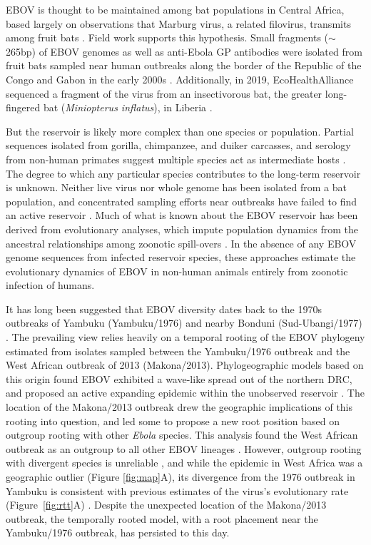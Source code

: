 \documentclass[11pt,a4paper]{article}
\begin{document}
EBOV is thought to be maintained among bat populations in Central Africa, based largely on observations that Marburg virus, a related filovirus, transmits among fruit bats \cite{Towner2009-kz,Paweska2020-fz}.
Field work supports this hypothesis.
Small fragments ($\sim$265bp) of EBOV genomes as well as anti-Ebola GP antibodies were isolated from fruit bats sampled near human outbreaks along the border of the Republic of the Congo and Gabon in the early 2000s \cite{Leroy2005-vr}.
Additionally, in 2019, EcoHealthAlliance sequenced a fragment of the virus from an insectivorous bat, the greater long-fingered bat (\textit{Miniopterus inflatus}), in Liberia \cite{Kupferschmidt2021-mf,Kessler2019-gk,Kessler2019-lq}.


But the reservoir is likely more complex than one species or population.
Partial sequences isolated from gorilla, chimpanzee, and duiker carcasses, and serology from non-human primates suggest multiple species act as intermediate hosts \cite{Leroy2004-jr,Leroy2004-fk,Wittmann2007-hm}. 
The degree to which any particular species contributes to the long-term reservoir is unknown.
Neither live virus nor whole genome has been isolated from a bat population, and concentrated sampling efforts near outbreaks have failed to find an active reservoir \cite{Lacroix2021-zs}.
Much of what is known about the EBOV reservoir has been derived from evolutionary analyses, which impute population dynamics from the ancestral relationships among zoonotic spill-overs \cite{Wittmann2007-hm,Biek2006-br,Walsh2005-zc}. 
In the absence of any EBOV genome sequences from infected reservoir species, these approaches estimate the evolutionary dynamics of EBOV in non-human animals entirely from zoonotic infection of humans. 


It has long been suggested that EBOV diversity dates back to the 1970s outbreaks of Yambuku (Yambuku/1976) and nearby Bonduni (Sud-Ubangi/1977) \cite{Heymann1980-dq,Carroll2013-jz,Biek2006-br,Walsh2005-zc,Grard2011-ue}.
The prevailing view relies heavily on a temporal rooting of the EBOV phylogeny estimated from isolates sampled between the Yambuku/1976 outbreak and the West African outbreak of 2013 (Makona/2013).
Phylogeographic models based on this origin found EBOV exhibited a wave-like spread out of the northern DRC, and proposed an active expanding epidemic within the unobserved reservoir \cite{Walsh2005-zc}.
The location of the Makona/2013 outbreak drew the geographic implications of this rooting into question, and led some to propose a new root position based on outgroup rooting with other \textit{Ebola} species.
This analysis found the West African outbreak as an outgroup to all other EBOV lineages \cite{Baize2014-hp}.
However, outgroup rooting with divergent species is unreliable \cite{Wheeler1990}, and while the epidemic in West Africa was a geographic outlier (Figure \ref{fig:map}A), its divergence from the 1976 outbreak in Yambuku is consistent with previous estimates of the virus's evolutionary rate (Figure~\ref{fig:rtt}A) \cite{Dudas2014-do}. 
Despite the unexpected location of the Makona/2013 outbreak, the temporally rooted model, with a root placement near the Yambuku/1976 outbreak, has persisted to this day.
\end{document}
